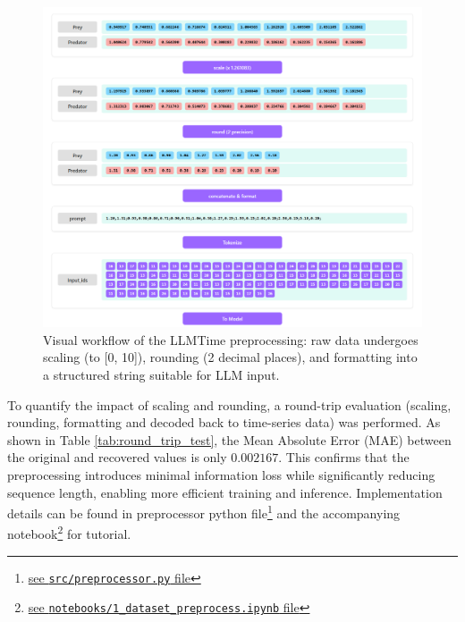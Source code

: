 \documentclass{article}
\begin{document}
\begin{figure}[!htbp]
    \centering
    \includegraphics[width=\linewidth]{M2 Course Work/Images/preprocess_vis.png}
    \caption{Visual workflow of the LLMTime preprocessing: raw data undergoes scaling (to [0, 10]), rounding (2 decimal places), and formatting into a structured string suitable for LLM input.}
    \label{fig:preprocessing_visual_workflow}
\end{figure}


To quantify the impact of scaling and rounding, a round-trip evaluation (scaling, rounding, formatting and decoded back to time-series data) was performed. As shown in Table \ref{tab:round_trip_test}, the Mean Absolute Error (MAE) between the original and recovered values is only $0.002167$. This confirms that the preprocessing introduces minimal information loss while significantly reducing sequence length, enabling more efficient training and inference. Implementation details can be found in preprocessor python file\footnote{\href{https://gitlab.developers.cam.ac.uk/phy/data-intensive-science-mphil/assessments/m2_coursework/ym429/-/blob/main/src/preprocessor.py?ref_type=heads}{see \texttt{src/preprocessor.py} file}} and the accompanying notebook\footnote{\href{https://gitlab.developers.cam.ac.uk/phy/data-intensive-science-mphil/assessments/m2_coursework/ym429/-/blob/main/notebooks/1_dataset_preprocess.ipynb?ref_type=heads}{see \texttt{notebooks/1\_dataset\_preprocess.ipynb} file}} for tutorial.
\end{document}
